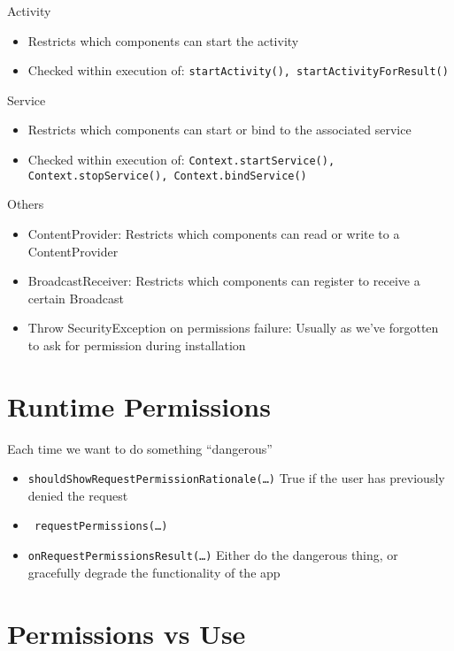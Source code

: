 \documentclass{article}
\begin{document}
\begin{flushleft}
Activity
\begin{itemize}
  \item Restricts which components can start the activity 
  \item Checked within execution of: \verb|startActivity(), startActivityForResult()|
\end{itemize}
Service
\begin{itemize}
  \item Restricts which components can start or bind to the associated service 
  \item Checked within execution of: \verb|Context.startService(), Context.stopService(), Context.bindService()|
\end{itemize}
Others
\begin{itemize}
  \item ContentProvider: Restricts which components can read or write to a ContentProvider
  \item BroadcastReceiver: Restricts which components can register to receive a certain Broadcast 
  \item Throw SecurityException on permissions failure: Usually as we’ve forgotten to ask for permission during installation
\end{itemize}
\end{flushleft}

\section{Runtime	Permissions}

\begin{flushleft}
Each time we want to do something “dangerous”
\begin{itemize}
  \item \verb|shouldShowRequestPermissionRationale(…)| True if the user has previously denied the request
  \item \verb| requestPermissions(…)|
  \item \verb|onRequestPermissionsResult(…)| Either do the dangerous thing, or gracefully degrade the functionality of the app
\end{itemize}
\end{flushleft}

\section{Permissions vs Use}
\end{document}
